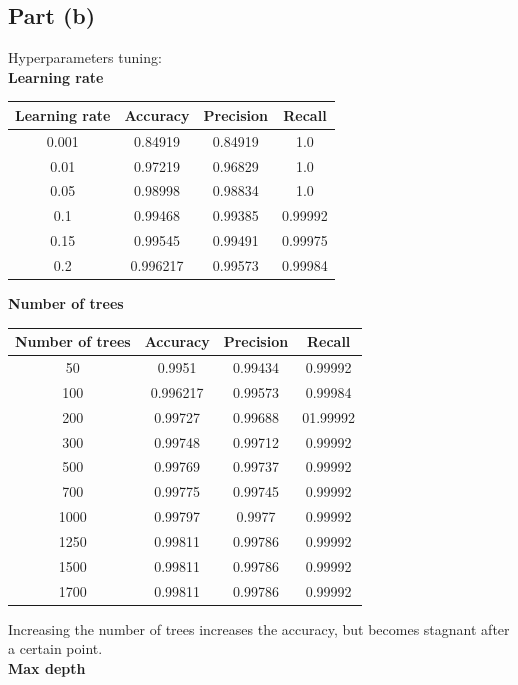 \documentclass[12pt]{article}
\begin{document}
\subsection*{Part (b)}
Hyperparameters tuning: \\
\textbf{Learning rate}
\begin{center}
    \begin{tabular}{|c|c|c|c|}
        \hline
        Learning rate & Accuracy & Precision & Recall \\
        \hline
        0.001 & 0.84919 & 0.84919 & 1.0 \\
        0.01 & 0.97219 & 0.96829 & 1.0 \\
        0.05 & 0.98998 & 0.98834 & 1.0 \\
        0.1 & 0.99468 & 0.99385 & 0.99992 \\
        0.15 & 0.99545 & 0.99491 & 0.99975 \\
        0.2 & 0.996217 & 0.99573 & 0.99984 \\ 
        \hline
    \end{tabular}
\end{center}
\textbf{Number of trees}
\begin{center}
    \begin{tabular}{|c|c|c|c|}
        \hline
        Number of trees & Accuracy & Precision & Recall \\
        \hline
        50 & 0.9951 & 0.99434 & 0.99992 \\
        100 & 0.996217 & 0.99573 & 0.99984 \\
        200 & 0.99727 & 0.99688 & 01.99992 \\
        300 & 0.99748 & 0.99712 & 0.99992 \\
        500 & 0.99769 & 0.99737 & 0.99992 \\
        700 & 0.99775 & 0.99745 & 0.99992 \\
        1000 & 0.99797 & 0.9977 & 0.99992 \\
        1250 & 0.99811 & 0.99786 & 0.99992 \\
        1500 & 0.99811 & 0.99786 & 0.99992 \\
        1700 & 0.99811 & 0.99786 & 0.99992 \\ 
        \hline
    \end{tabular}
\end{center}
Increasing the number of trees increases the accuracy, but becomes stagnant after a certain point. \\
\textbf{Max depth}
\end{document}
